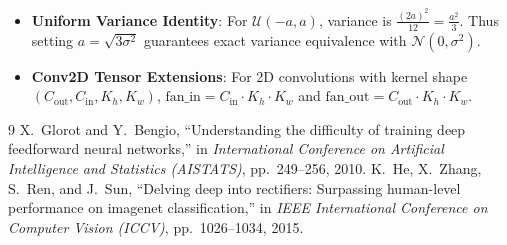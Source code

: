 \documentclass[11pt,a4paper]{article}
\theoremstyle{definition}
\begin{document}
\begin{itemize}
    \item \textbf{Uniform Variance Identity}: For $\mathcal{U}(-a, a)$, variance is $\frac{(2a)^2}{12} = \frac{a^2}{3}$. Thus setting $a = \sqrt{3 \sigma^2}$ guarantees exact variance equivalence with $\mathcal{N}(0, \sigma^2)$.
    \item \textbf{Conv2D Tensor Extensions}: For 2D convolutions with kernel shape $(C_{\text{out}}, C_{\text{in}}, K_h, K_w)$, $\text{fan\_in} = C_{\text{in}} \cdot K_h \cdot K_w$ and $\text{fan\_out} = C_{\text{out}} \cdot K_h \cdot K_w$.
\end{itemize}

\begin{thebibliography}{9}
 X.~Glorot and Y.~Bengio, ``Understanding the difficulty of training deep feedforward neural networks,'' in \emph{International Conference on Artificial Intelligence and Statistics (AISTATS)}, pp.~249--256, 2010.
 K.~He, X.~Zhang, S.~Ren, and J.~Sun, ``Delving deep into rectifiers: Surpassing human-level performance on imagenet classification,'' in \emph{IEEE International Conference on Computer Vision (ICCV)}, pp.~1026--1034, 2015.
\end{thebibliography}
\end{document}
